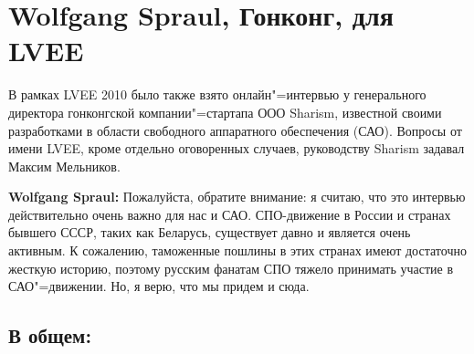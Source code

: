\documentclass[10pt, a5paper]{article}
\begin{document}



\section{Wolfgang Spraul, Гонконг, для LVEE}

В рамках LVEE 2010 было также взято онлайн"=интервью у генерального директора гонконгской компании"=стартапа ООО Sharism, известной своими разработками в области свободного аппаратного обеспечения (САО). Вопросы от имени LVEE, кроме отдельно оговоренных случаев, руководству Sharism задавал Максим Мельников.

{\noindent \bf Wolfgang Spraul:} Пожалуйста, обратите внимание: я считаю, что это интервью действительно очень важно для нас и САО. СПО-движение в России и странах бывшего СССР, таких как Беларусь, существует давно и является очень активным. К сожалению, таможенные пошлины в этих странах имеют достаточно жесткую историю, поэтому русским фанатам СПО тяжело принимать участие в САО"=движении. Но, я верю, что мы придем и сюда.

\subsection*{В общем:}
\end{document}
